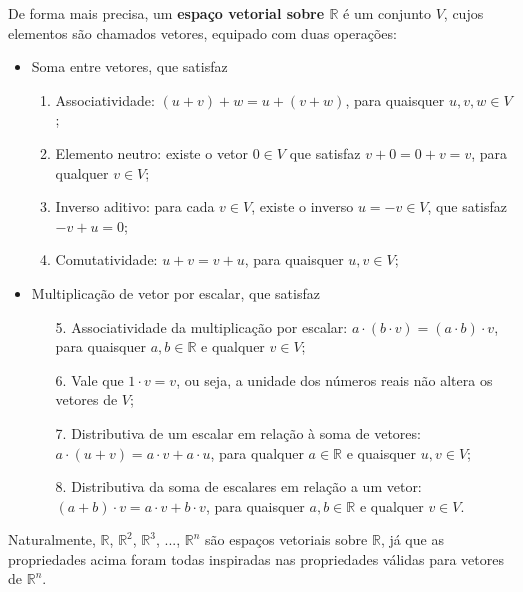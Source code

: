 De forma mais precisa, um \textbf{espaço vetorial sobre $\mathbb{R}$} é um conjunto $V$, cujos elementos são chamados vetores, equipado com duas operações:
\begin{itemize}
	\item Soma entre vetores, que satisfaz
	\begin{enumerate}
		\item Associatividade: $(u+v)+w=u+(v+w)$, para quaisquer $u,v,w \in V$;
		\item Elemento neutro: existe o vetor $0 \in V$ que satisfaz $v+0=0+v=v$, para qualquer $v \in V$;
		\item Inverso aditivo: para cada $v \in V$, existe o inverso $u= -v \in V$, que satisfaz $-v+u=0$;
		\item Comutatividade: $u+v = v+u$, para quaisquer $u, v \in V$;
	\end{enumerate}
	\item Multiplicação de vetor por escalar, que satisfaz
	\begin{enumerate}
		\item[5.] Associatividade da multiplicação por escalar: $a\cdot (b\cdot v)=(a\cdot b)\cdot v$, para quaisquer $a,b \in \mathbb{R}$ e qualquer $v \in V$;
		\item[6.] Vale que $1 \cdot v = v$, ou seja, a unidade dos números reais não altera os vetores de $V$;
		\item[7.] Distributiva de um escalar em relação à soma de vetores: $a \cdot (u+v) = a\cdot v+a\cdot u$, para qualquer $a \in \mathbb{R}$ e quaisquer $u,v \in V$;
		\item[8.] Distributiva da soma de escalares em relação a um vetor: $(a+b) \cdot v = a \cdot v+b \cdot v$, para quaisquer $a,b \in \mathbb{R}$ e qualquer $v \in V$.
	\end{enumerate}
\end{itemize}

\begin{ex}
	Naturalmente, $\mathbb{R}$, $\mathbb{R}^2$, $\mathbb{R}^3$, ..., $\mathbb{R}^n$ são espaços vetoriais sobre $\mathbb{R}$, já que as propriedades acima foram todas inspiradas nas propriedades válidas para vetores de $\mathbb{R}^n$.
\end{ex}



